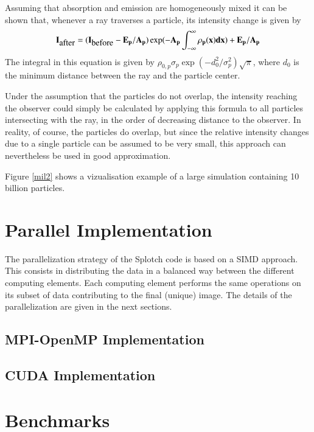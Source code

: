 Assuming that absorption and emission are homogeneously mixed it
can be shown that, whenever a ray traverses a particle, its intensity
change is given by
\begin{equation}
\label{i_change}
\bf{I}_{\mbox{after}}=(\bf{I}_{\mbox{before}}-\bf{E}_p/\bf{A}_p)\exp(-\bf{A}_p\int_{-\infty}^\infty\rho_p(x)dx) + \bf{E}_p/\bf{A}_p
\end{equation}
The integral in this equation is given by
$\rho_{0,p}\sigma_p\exp{(-d_0^2/\sigma_p^2)}\sqrt{\pi}$, where $d_0$
is the minimum distance between the ray and the particle center.

Under the assumption that the particles do not overlap, the intensity
reaching the observer could simply be calculated by applying this formula to
all particles intersecting with the ray, in the order of decreasing distance
to the observer. In reality, of course, the particles do overlap, but since
the relative intensity changes due to a single particle can be assumed to be
very small, this approach can nevertheless be used in good approximation.

Figure \ref{mil2} shows a vizualisation example of a large simulation 
containing 10 billion particles.

\section{Parallel Implementation}
\label{parallel}

The parallelization strategy of the Splotch code is based on a SIMD approach. This consists in 
distributing the data in a balanced way between the different computing elements.
Each computing element performs the same operations on its subset of data contributing 
to the final (unique) image. The details of the parallelization are given in the next sections.

\subsection{MPI-OpenMP Implementation}
\label{mpi}

\subsection{CUDA Implementation}
\label{cuda}

\section{Benchmarks}
\label{bench}

